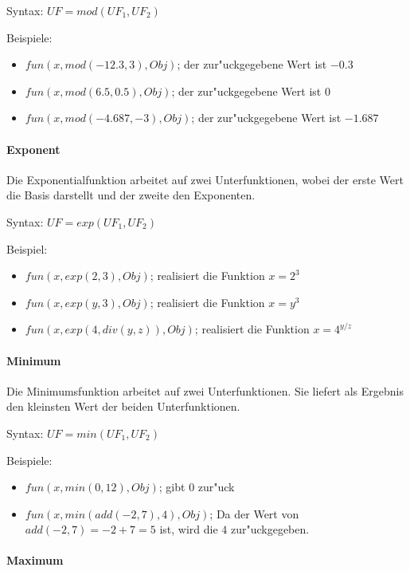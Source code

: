 \bigskip\noindent
Syntax:
$UF=mod( UF_1, UF_2 )$

\bigskip\noindent
Beispiele:
\begin{itemize}
 \item $fun(x, mod( -12.3, 3 ), Obj)$; der zur"uckgegebene Wert ist $-0.3$
 \item $fun(x, mod( 6.5, 0.5 ), Obj)$; der zur"uckgegebene Wert ist $0$
 \item $fun(x, mod( -4.687, -3 ), Obj)$; der zur"uckgegebene Wert ist $-1.687$
\end{itemize}


\paragraph{Exponent}

Die Exponentialfunktion arbeitet auf zwei Unterfunktionen, wobei der erste Wert die Basis darstellt und der zweite den Exponenten.

\bigskip\noindent
Syntax:
$UF=exp( UF_1, UF_2 )$

\bigskip\noindent
Beispiel:
\begin{itemize}
 \item $fun(x, exp( 2, 3), Obj)$; realisiert die Funktion $x=2^3$
 \item $fun(x, exp( y, 3), Obj)$; realisiert die Funktion $x=y^3$
 \item $fun(x, exp( 4, div(y,z) ), Obj)$; realisiert die Funktion $x=4^{y/z}$
\end{itemize}


\paragraph{Minimum}

Die Minimumsfunktion arbeitet auf zwei Unterfunktionen. Sie liefert als Ergebnis den kleinsten Wert der beiden Unterfunktionen.

\bigskip\noindent
Syntax:
$UF=min( UF_1, UF_2 )$

\bigskip\noindent
Beispiele:
\begin{itemize}
 \item $fun(x, min( 0, 12 ), Obj)$; gibt $0$ zur"uck
 \item $fun(x, min( add( -2, 7 ), 4 ), Obj)$; Da der Wert von $add( -2, 7 )= -2+7 = 5$ ist, wird die $4$ zur"uckgegeben.
\end{itemize}


\paragraph{Maximum}

